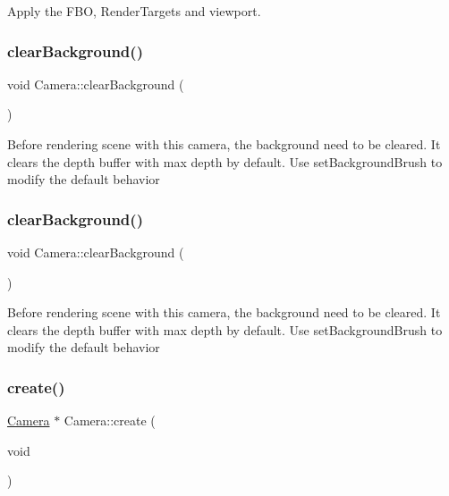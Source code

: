 Apply the F\+BO, Render\+Targets and viewport. \mbox{\label{classCamera_ab343c58b5c9ad180b3b11bb42a32920c}} 
\subsubsection{\texorpdfstring{clear\+Background()}{clearBackground()}\hspace{0.1cm}{\footnotesize\ttfamily [1/2]}}
{\footnotesize\ttfamily void Camera\+::clear\+Background (\begin{DoxyParamCaption}{ }\end{DoxyParamCaption})}

Before rendering scene with this camera, the background need to be cleared. It clears the depth buffer with max depth by default. Use set\+Background\+Brush to modify the default behavior \mbox{\label{classCamera_ab343c58b5c9ad180b3b11bb42a32920c}} 
\subsubsection{\texorpdfstring{clear\+Background()}{clearBackground()}\hspace{0.1cm}{\footnotesize\ttfamily [2/2]}}
{\footnotesize\ttfamily void Camera\+::clear\+Background (\begin{DoxyParamCaption}{ }\end{DoxyParamCaption})}

Before rendering scene with this camera, the background need to be cleared. It clears the depth buffer with max depth by default. Use set\+Background\+Brush to modify the default behavior \mbox{\label{classCamera_a21e3aed4000a43486ecba275d1c0d8fb}} 
\subsubsection{\texorpdfstring{create()}{create()}\hspace{0.1cm}{\footnotesize\ttfamily [1/2]}}
{\footnotesize\ttfamily \hyperlink{classCamera}{Camera} $\ast$ Camera\+::create (\begin{DoxyParamCaption}\item[{void}]{ }\end{DoxyParamCaption})\hspace{0.3cm}{\ttfamily [static]}}

